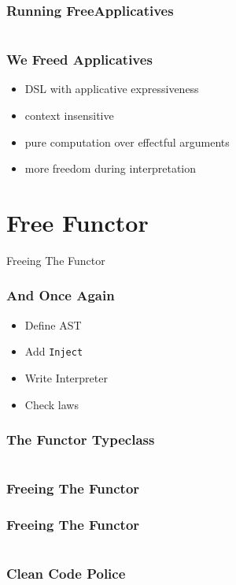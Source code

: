 \documentclass{beamer}
\newcommand{\recipe}{%
  \begin{itemize}
  \item Define AST
  \item Add \texttt{Inject}
  \item Write Interpreter
  \item Check laws
  \end{itemize}
}
\begin{document}
\begin{frame}
  \frametitle{Running FreeApplicatives}
  \inputminted{scala}{snippets/freeap-interp.scala}
\end{frame}

\begin{frame}
  \frametitle{We Freed Applicatives}
  \begin{itemize}
  \item DSL with applicative expressiveness
  \item context insensitive
  \item pure computation over effectful arguments
  \item more freedom during interpretation
  \end{itemize}
\end{frame}

\section{Free Functor}\label{sec:free-functor}
\begin{frame}
  \begin{center}
    \Huge
    Freeing The Functor
  \end{center}
\end{frame}

\begin{frame}[fragile]
  \frametitle{And Once Again}
  \recipe{}
\end{frame}

\begin{frame}[fragile]
  \frametitle{The Functor Typeclass}
  \inputminted{scala}{snippets/functor-typeclass.scala}
\end{frame}

\begin{frame}[fragile]
  \frametitle{Freeing The Functor}
\end{frame}

\begin{frame}[fragile]
  \frametitle{Freeing The Functor}
  \inputminted{scala}{snippets/free-functor2.scala}
\end{frame}

\begin{frame}[fragile]
  \frametitle{Clean Code Police}
\end{frame}
\end{document}
